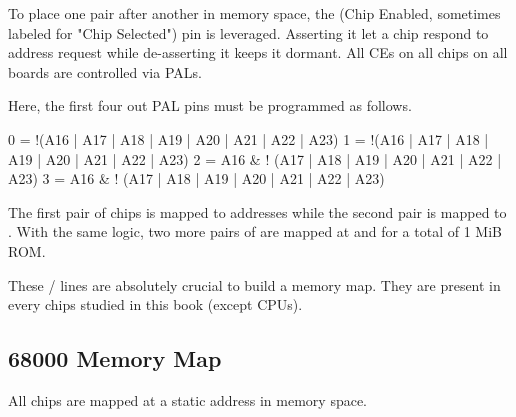 To place one pair after another in memory space, the  (Chip Enabled, sometimes labeled  for "Chip Selected") pin is leveraged. Asserting it let a chip respond to address request while de-asserting it keeps it dormant. All CEs on all chips on all boards are controlled via PALs.

Here, the first four out PAL pins must be programmed as follows.

\begin{code}
0 = !(A16  | A17 | A18 | A19 | A20 | A21 | A22 | A23)  
1 = !(A16  | A17 | A18 | A19 | A20 | A21 | A22 | A23)  
2 = A16 & ! (A17 | A18 | A19 | A20 | A21 | A22 | A23)  
3 = A16 & ! (A17 | A18 | A19 | A20 | A21 | A22 | A23)  
\end{code}

The first pair of chips is mapped to addresses  while the second pair is mapped to . With the same logic, two more pairs of  are mapped at  and  for a total of 1 MiB ROM.




These  /  lines are absolutely crucial to build a memory map. They are present in every chips studied in this book (except CPUs).

\subsection{68000 Memory Map}

All chips are mapped at a static address in memory space.

